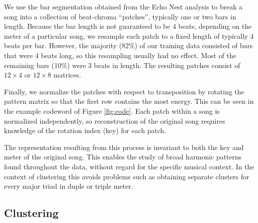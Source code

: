 \documentclass{article}
\begin{document}
We use the bar segmentation obtained from the Echo Nest analysis to
break a song into a collection of beat-chroma ``patches'', typically
one or two bars in length.
%
Because the bar length is not guaranteed to be 4 beats, 
depending on the meter of a particular
song, we resample each patch to a fixed length of typically 4 beats
per bar.  However, the majority (82\%) of our training data
consisted of bars that were 4 beats long, so this resampling 
usually had no effect.  Most of the remaining bars (10\%) were 3 beats in
length.
The resulting patches consist of $12 \times 4$ or $12 \times 8$ matrices.

Finally, we normalize the patches with respect to transposition by rotating
the pattern matrix so that the first row contains the most
energy. This can be seen in the example codeword of Figure \ref{fig:code}.
Each patch within a song is normalized independently, so
reconstruction of the original song requires knowledge of the
rotation index (key) for each patch.

The representation resulting from this process is invariant to both
the key and meter of the original song.  This enables the study of
broad harmonic patterns found throughout the data, without regard for
the specific musical context.
%
In the context of clustering this avoids problems such as obtaining separate
clusters for every major triad in duple or triple meter.
%

\subsection{Clustering}
\end{document}
